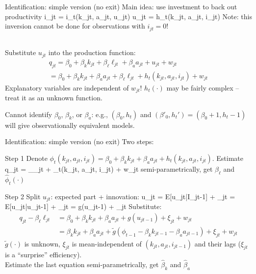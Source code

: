 \begin{frame}{Identification: simple version (no exit)}
Main idea: use investment to back out productivity
\be
	i_{jt} = i_t(k_{jt}, a_{jt}, u_{jt}) \Longrightarrow u_{jt} = h_t(k_{jt}, a_{jt}, i_{jt})
\ee
Note: this inversion cannot be done for observations with $i_{jt} = 0$!\\\

Substitute $u_{jt}$ into the production function:
\begin{multline*}
	q_{jt} = \beta_0 + \beta_kk_{jt} + \beta_\ell\ell_{jt} + \beta_aa_{jt} + u_{jt} + w_{jt}\\
	= \beta_0 + \beta_kk_{jt} + \beta_aa_{jt} + \beta_\ell\ell_{jt} + h_t(k_{jt}, a_{jt}, i_{jt}) + w_{jt}
\end{multline*}
Explanatory variables are independent of $w_{jt}$! $h_t(\cdot)$ may be fairly complex -- treat it as an unknown function.\\\bigskip

Cannot identify $\beta_0$, $\beta_k$, or $\beta_a$: e.g., $(\beta_0, h_t)$ and $(\beta'_0, h_t') = (\beta_0+1, h_t-1)$ will give observationally equivalent models.
\end{frame}

\begin{frame}{Identification: simple version (no exit)}
	Two steps:
	\bi
		\item[Step 1]{Denote $\phi_t(k_{jt}, a_{jt}, i_{jt}) = \beta_0 + \beta_kk_{jt} + \beta_aa_{jt} + h_t(k_{jt}, a_{jt}, i_{jt})$. Estimate}
		\be
			q_{jt} = \beta_\ell\ell_{jt} + \phi_t(k_{jt}, a_{jt}, i_{jt}) + w_{jt}
		\ee
		semi-parametrically, get $\widehat{\beta}_\ell$ and $\widehat{\phi}_t(\cdot)$		
		\item[Step 2]{Split $u_{jt}$: expected part + innovation: 
		\be
			u_{jt} = E[u_{jt}|I_{jt-1}] + \xi_{jt} = E[u_{jt}|u_{jt-1}] + \xi_{jt} = g(u_{jt-1}) + \xi_{jt}
		\ee
		Substitute:
		\begin{align*}
			q_{jt} - \beta_\ell\ell_{jt} &= \beta_0 + \beta_kk_{jt} + \beta_aa_{jt} + g(u_{jt-1}) + \xi_{jt} + w_{jt}\\
			&= \beta_kk_{jt} + \beta_aa_{jt} + \widetilde{g}(\phi_{t-1} - \beta_kk_{jt-1} - \beta_aa_{jt-1}) + \xi_{jt} + w_{jt}
		\end{align*}
		$\widetilde{g}(\cdot)$ is unknown, $\xi_{jt}$ is mean-independent of $(k_{jt}, a_{jt}, i_{jt-1})$ and their lags ($\xi_{jt}$ is a ``surprise'' efficiency).\\
		
		Estimate the last equation semi-parametrically, get $\widehat{\beta}_k$ and $\widehat{\beta}_a$}
	\ei
\end{frame}

